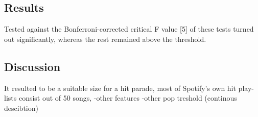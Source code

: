 \documentclass{article}
\begin{document}
\subsection{Results}
Tested against the Bonferroni-corrected critical F value [5] of these tests turned out significantly, whereas the rest remained above the threshold. %

\subsection{Discussion}

 It resulted  to be a suitable size for a hit parade, most of Spotify's own hit play-lists consist out of 50 songs, 
-other features
-other pop treshold (continous descibtion)


\end{document}

